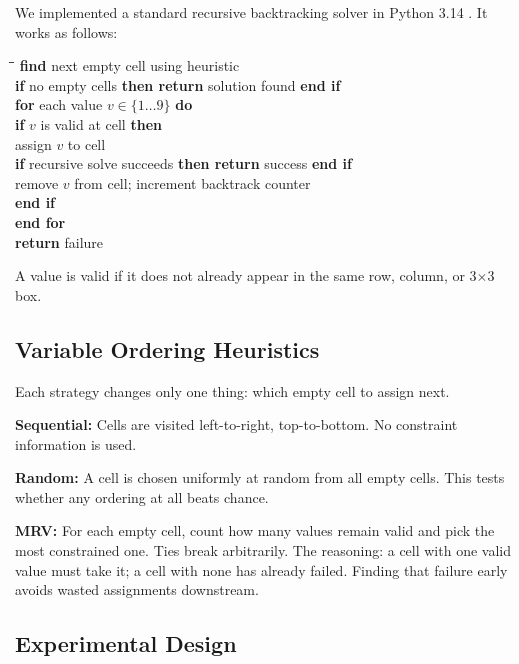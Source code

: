 \documentclass[conference]{IEEEtran}
\begin{document}
We implemented a standard recursive backtracking solver in Python 3.14 \cite{russell_norvig}. It works as follows:

\begin{tabbing}
\hspace{0.4cm}\=\hspace{0.4cm}\=\hspace{0.4cm}\=\kill
\textbf{find} next empty cell using heuristic \\
\textbf{if} no empty cells \textbf{then return} solution found \textbf{end if}\\
\textbf{for} each value $v \in \{1 \ldots 9\}$ \textbf{do} \\
\> \textbf{if} $v$ is valid at cell \textbf{then} \\
\>\> assign $v$ to cell \\
\>\> \textbf{if} recursive solve succeeds \textbf{then return} success \textbf{end if} \\
\>\> remove $v$ from cell; increment backtrack counter \\
\> \textbf{end if} \\
\textbf{end for} \\
\textbf{return} failure
\end{tabbing}

A value is valid if it does not already appear in the same row, column, or 3$\times$3 box.

\subsection{Variable Ordering Heuristics}

Each strategy changes only one thing: which empty cell to assign next.

\textbf{Sequential:} Cells are visited left-to-right, top-to-bottom. No constraint information is used.

\textbf{Random:} A cell is chosen uniformly at random from all empty cells. This tests whether any ordering at all beats chance.

\textbf{MRV:} For each empty cell, count how many values remain valid and pick the most constrained one. Ties break arbitrarily. The reasoning: a cell with one valid value must take it; a cell with none has already failed. Finding that failure early avoids wasted assignments downstream.

\subsection{Experimental Design}
\end{document}

